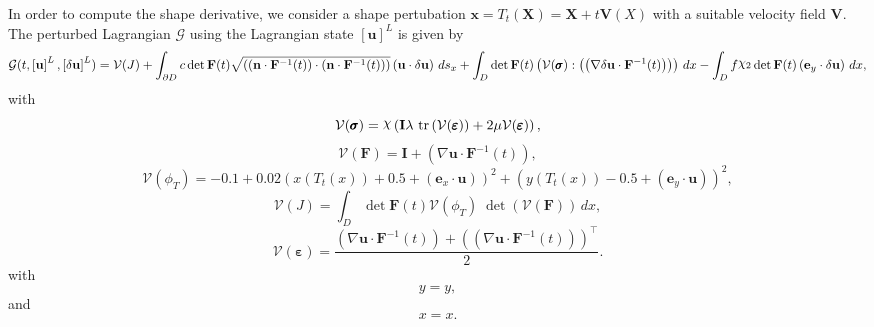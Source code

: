 \documentclass[preview]{standalone}
\let\oldcdot\cdot
\let\cdot\oldcdot
\begin{document}
In order to compute the shape derivative, we consider a shape pertubation $\mathbf x = T_t(\mathbf X) = \mathbf X + t \mathbf  V(X)$ with a suitable velocity field $\mathbf V$. The perturbed Lagrangian $\mathcal G$ using the Lagrangian state $\left[ {\mathbf{ u }}\right]^{L}$ is given by
\begin{dmath*}
\mathcal G(t,\left[ {\mathbf{ u }}\right]^{L},\left[ {\delta\mathbf{  u }}\right]^{L}) = \mathcal V(J) +  \int_{\partial D} c  \operatorname{det}\mathbf F( t )  \sqrt{\left( \left( \mathbf n \cdot  \mathbf F^{-1}(t) \right) \cdot \left( \mathbf n \cdot  \mathbf F^{-1}(t) \right) \right)} \left( {\mathbf{ u }} \cdot {\delta\mathbf{  u }} \right) \,ds_x +  \int_{D}  \operatorname{det}\mathbf F( t )  \left( \mathcal V(\pmb \sigma) \mathrel{:} \left( \left(  \nabla {\delta\mathbf{  u }}  \cdot  \mathbf F^{-1}(t) \right) \right)\right) \,dx -  \int_{D} f \raisebox{\depth}{$\chi_2$}  \operatorname{det}\mathbf F( t )  \left( \mathbf e_y \cdot {\delta\mathbf{  u }} \right) \,dx , 
\end{dmath*}
with
\begin{dmath*}
\mathcal V(\pmb \sigma) = \raisebox{\depth}{$\chi$} \left(\mathbf{I} \lambda  \,\operatorname{tr}\left(\mathcal V(\pmb \varepsilon)\right)  + 2 \mu \mathcal V(\pmb \varepsilon)\right),
 \end{dmath*}
\begin{dmath*}
\mathcal V(\mathbf F) = \mathbf{I} + \left(  \nabla {\mathbf{ u }}  \cdot  \mathbf F^{-1}(t) \right),
 \end{dmath*}
\begin{dmath*}
\mathcal V(\phi_{T}) = -0.1 + 0.02 \left(x(T_t(x)) + 0.5 + \left( \mathbf e_x \cdot {\mathbf{ u }} \right)\right)^{2} + \left(y(T_t(x)) - 0.5 + \left( \mathbf e_y \cdot {\mathbf{ u }} \right)\right)^{2},
 \end{dmath*}
\begin{dmath*}
\mathcal V(J) =  \int_{D}  \operatorname{det}\mathbf F( t )  \mathcal V(\phi_{T})  \;\operatorname{det}(\mathcal V(\mathbf F))  \,dx,
 \end{dmath*}
\begin{dmath*}
\mathcal V(\pmb \varepsilon) = \frac{\left(  \nabla {\mathbf{ u }}  \cdot  \mathbf F^{-1}(t) \right) +  \left( \left(  \nabla {\mathbf{ u }}  \cdot  \mathbf F^{-1}(t) \right) \right)^\top }{2}.
 \end{dmath*}
with 
\begin{dmath*}
y = y,\end{dmath*}
and\begin{dmath*}
x = x.\end{dmath*}
\end{document}
